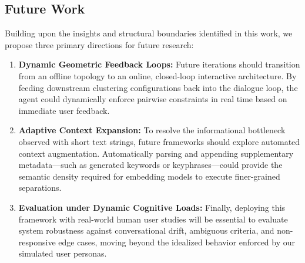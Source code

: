 \subsection{Future Work}
Building upon the insights and structural boundaries identified in this work, we propose three primary directions for future research:
\begin{enumerate}
    \item \textbf{Dynamic Geometric Feedback Loops:} Future iterations should transition from an offline topology to an online, closed-loop interactive architecture. By feeding downstream clustering configurations back into the dialogue loop, the agent could dynamically enforce pairwise constraints in real time based on immediate user feedback.
    \item \textbf{Adaptive Context Expansion:} To resolve the informational bottleneck observed with short text strings, future frameworks should explore automated context augmentation. Automatically parsing and appending supplementary metadata—such as generated keywords or keyphrases—could provide the semantic density required for embedding models to execute finer-grained separations.
    \item \textbf{Evaluation under Dynamic Cognitive Loads:} Finally, deploying this framework with real-world human user studies will be essential to evaluate system robustness against conversational drift, ambiguous criteria, and non-responsive edge cases, moving beyond the idealized behavior enforced by our simulated user personas.
\end{enumerate}